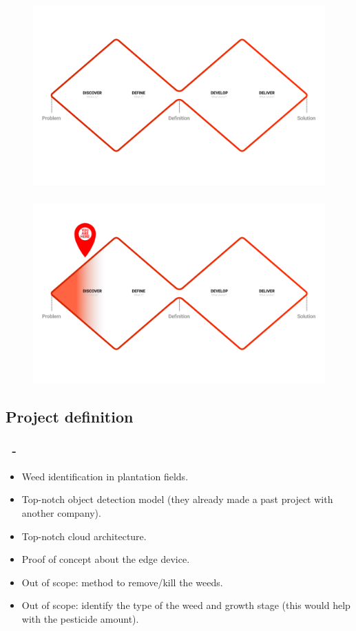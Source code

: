 \documentclass{beamer}
\begin{document}
\begin{frame}
\frametitle{\secname}
\begin{figure}
\includegraphics[width=0.9\linewidth]{Imagens/V1.png}
\end{figure}
\end{frame}


\begin{frame}
\frametitle{\secname}
\begin{figure}
\includegraphics[width=0.9\linewidth]{Imagens/V1 A.jpg}
\end{figure}
\end{frame}



\subsection{Project definition}
\begin{frame}
\frametitle{\secname\ - \subsecname}
\begin{itemize}
\item Weed identification in plantation fields.
\item Top-notch object detection model (they already made a past project with another company).
\item Top-notch cloud architecture.
\item Proof of concept about the edge device.
\item Out of scope: method to remove/kill the weeds.
\item Out of scope: identify the type of the weed and growth stage (this would help with the pesticide amount).
\end{itemize}



\end{frame}
\end{document}
